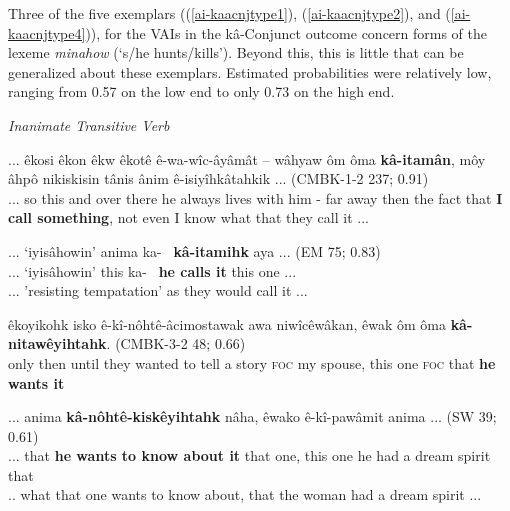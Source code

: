 Three of the five exemplars ((\ref{ai-kaacnjtype1}), (\ref{ai-kaacnjtype2}), and (\ref{ai-kaacnjtype4})),  for the VAIs in the kâ-Conjunct outcome concern forms of the lexeme \textit{minahow} (`s/he hunts/kills'). Beyond this, this is little that can be generalized about these exemplars. Estimated probabilities were relatively low, ranging from 0.57 on the low end to only 0.73 on the high end.
    
\vspace{5mm}
\textit{Inanimate Transitive Verb}

    \begin{exe}
    \ex
    \gll ... êkosi êkon êkw êkotê ê-wa-wîc-âyâmât – wâhyaw ôm ôma \textbf{kâ-itamân}, {môy âhpô} nikiskisin tânis ânim ê-isiyîhkâtahkik ... \tiny{(CMBK-1-2 237; 0.91)} \\
    ... so this and {over there} {he always lives with him} - {far away} {then} {the fact that} {\textbf{I call something}}, {not even} {I know} what that {they call it} ...\\
    \trans 
    \label{ti-kaacnjtype1}
    \end{exe}
    
    \begin{exe}
    \ex
    \gll ... `iyisâhowin' anima ka-~ \textbf{kâ-itamihk} aya ... \tiny{(EM 75; 0.83)}\\
    ... `iyisâhowin' this ka-~ {\textbf{he calls it}} {this one} ... \\
    \trans ... 'resisting tempatation' as they would call it ... \tiny{\citep[46-47]{Minde1997kwayask}}
    \label{ti-kaacnjtype2}
    \end{exe}
    
    
    \begin{exe}
    \ex
    \gll êkoyikohk isko ê-kî-nôhtê-âcimostawak awa niwîcêwâkan, êwak ôm ôma \textbf{kâ-nitawêyihtahk}. \tiny{(CMBK-3-2 48; 0.66)}\\
    {only then} until {they wanted to tell a story} \textsc{foc} {my spouse}, {this one} \textsc{foc} that {\textbf{he wants it}}  \\
    \trans 
    \label{ti-kaacnjtype3}
    \end{exe}
    
    
    \begin{exe}
    \ex
    \gll ... anima \textbf{kâ-nôhtê-kiskêyihtahk} nâha, êwako ê-kî-pawâmit anima ... \tiny{(SW 39; 0.61)}\\
    ... that {\textbf{he wants to know about it}} {that one}, {this one} {he had a dream spirit} {that}  \\
    \trans .. what that one wants to know about, that the woman had a dream spirit ... \tiny{\citep[36-37]{Whitecalf1993}}
    \label{ti-kaacnjtype4}
    \end{exe}
    

